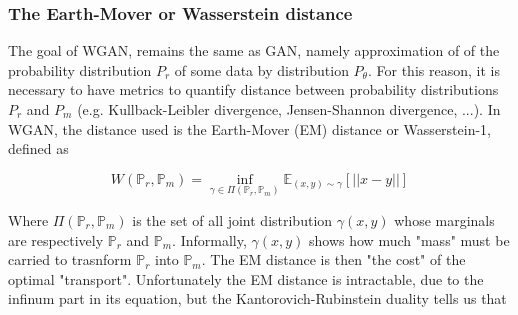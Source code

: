 \documentclass{article}
\begin{document}

\subsubsection{The Earth-Mover or Wasserstein distance}


The goal of WGAN, remains the same as GAN, namely approximation of of the probability distribution $P_r$ of some data by distribution $P_{\theta}$. For this reason, it is necessary to have metrics to quantify distance between probability distributions $P_r$ and $P_m$ (e.g. Kullback-Leibler divergence, Jensen-Shannon divergence, ...). In WGAN, the distance used is the Earth-Mover (EM) distance or Wasserstein-1, defined as 

\begin{equation}
    W(\mathbb{P}_r, \mathbb{P}_m) = \inf_{\gamma \in \Pi(\mathbb{P}_r, \mathbb{P}_m)} \mathbb{E}_{(x,y) \sim \gamma} [||x-y||]
\end{equation}

Where $\Pi(\mathbb{P}_r, \mathbb{P}_m)$ is the set of all joint distribution $\gamma(x,y)$ whose marginals are respectively $\mathbb{P}_r$ and $\mathbb{P}_m$. Informally, $\gamma(x,y)$ shows how much "mass" must be carried to trasnform $\mathbb{P}_r$ into $\mathbb{P}_m$. The EM distance is then "the cost" of the optimal "transport". Unfortunately the EM distance is intractable, due to the infinum part in its equation, but the Kantorovich-Rubinstein duality tells us that
\end{document}
